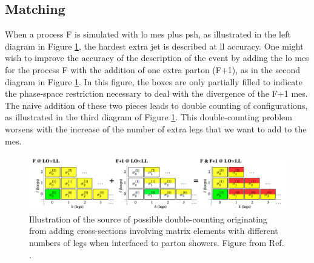\subsection{Matching}

When a process F is simulated with \gls{lo} \glspl{me} plus \gls{psh}, as illustrated in the left diagram in Figure \ref{fig:sim:matching}, 
the hardest extra jet is described at \gls{ll} accuracy. 
One might wish to improve the accuracy of the description of the event by adding the \gls{lo} \glspl{me} 
for the process F with the addition of one extra parton (F+1), as in the second diagram in Figure \ref{fig:sim:matching}. 
In this figure, the boxes are only partially filled to indicate the phase-space restriction 
necessary to deal with the divergence of the F+1 \glspl{me}. 
The naive addition of these two pieces leads to double counting of configurations, 
as illustrated in the third diagram of Figure \ref{fig:sim:matching}. 
This double-counting problem worsens with the increase of the number of extra legs that we want to add to the \glspl{me}.

\begin{figure}[h]
\begin{center}
    \includegraphics[width=\textwidth]{figures/simul/matching}
\end{center}
\caption{Illustration of the source of possible double-counting originating from  adding cross-sections involving matrix
elements with different numbers of legs when interfaced to parton showers. Figure from Ref. \cite{Skands:2011pf}.}
 \label{fig:sim:matching}
\end{figure}

